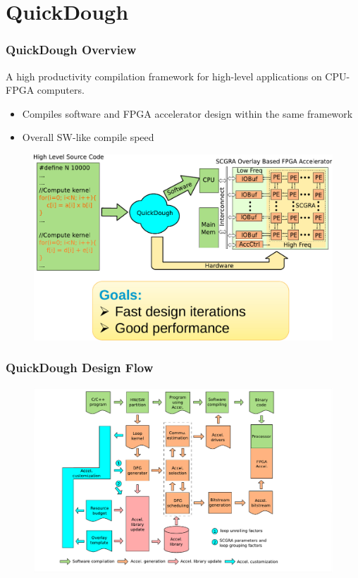 \documentclass[accentcolor=tud1a,colorbacktitle,inverttitle,landscape,german,presentation,t]{tudbeamer}
\begin{document}
\section{QuickDough}
  \begin{frame}
  \frametitle{QuickDough Overview}
  \vspace{-0.6em}
  A high productivity compilation framework for high-level applications on CPU-FPGA computers.
  \begin{itemize}
    \item Compiles software and FPGA accelerator design within the same framework
    \item Overall SW-like compile speed
  \end{itemize}

  \begin{figure}
     \includegraphics[width=.75\linewidth]{qd-overview}
  \end{figure}
  \end{frame}

  \begin{frame}
  \frametitle{QuickDough Design Flow}
  \begin{figure}
     \includegraphics[width=.95\linewidth]{qd-flow1}
  \end{figure}
  \end{frame}
\end{document}
